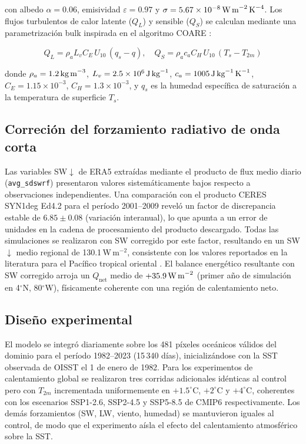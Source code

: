 \documentclass[12pt, a4paper]{article}
\begin{document}
\noindent con albedo $\alpha = 0.06$, emisividad $\varepsilon = 0.97$ y 
$\sigma = 5.67 \times 10^{-8}\,\text{W\,m}^{-2}\,\text{K}^{-4}$. Los flujos 
turbulentos de calor latente ($Q_L$) y sensible ($Q_S$) se calculan mediante una 
parametrizaci\'on bulk inspirada en el algoritmo COARE 
\cite{Fairall1996, Fairall2003}:

\begin{equation}
	Q_L = \rho_a L_v C_E\, U_{10}\,(q_s - q), \quad
	Q_S = \rho_a c_a C_H\, U_{10}\,(T_s - T_{2m})
	\label{eq:turb}
\end{equation}

\noindent donde $\rho_a = 1.2\,\text{kg\,m}^{-3}$, $L_v = 2.5 \times 10^6\,\text{J\,kg}^{-1}$, 
$c_a = 1005\,\text{J\,kg}^{-1}\,\text{K}^{-1}$, $C_E = 1.15 \times 10^{-3}$, 
$C_H = 1.3 \times 10^{-3}$, y $q_s$ es la humedad espec\'ifica de saturaci\'on a la 
temperatura de superficie $T_s$.

\subsection{Correci\'on del forzamiento radiativo de onda corta}

Las variables SW$\downarrow$ de ERA5 extra\'idas mediante el producto de flux medio diario 
(\texttt{avg\_sdswrf}) presentaron valores sistem\'aticamente bajos respecto a 
observaciones independientes. Una comparaci\'on con el producto CERES SYN1deg Ed4.2 para 
el per\'iodo 2001--2009 revel\'o un factor de discrepancia estable de $6.85 \pm 0.08$ 
(variaci\'on interanual), lo que apunta a un error de unidades en la cadena de 
procesamiento del producto descargado. Todas las simulaciones se realizaron con SW 
corregido por este factor, resultando en un SW$\downarrow$ medio regional de 130.1\,W\,m$^{-2}$, 
consistente con los valores reportados en la literatura para el Pac\'ifico tropical 
oriental \cite{SwensonHansen1999}. El balance energ\'etico resultante con SW corregido 
arroja un $Q_\text{net}$ medio de $+35.9\,\text{W\,m}^{-2}$ (primer a\~no de 
simulaci\'on en 4$^{\circ}$N, 80$^{\circ}$W), f\'isicamente coherente con una 
regi\'on de calentamiento neto.

\subsection{Dise\~no experimental}

El modelo se integr\'o diariamente sobre los 481 p\'ixeles oce\'anicos v\'alidos del 
dominio para el per\'iodo 1982--2023 (15\,340 d\'ias), inicializ\'andose con la SST 
observada de OISST el 1 de enero de 1982. Para los experimentos de calentamiento global 
se realizaron tres corridas adicionales id\'enticas al control pero con $T_{2m}$ 
incrementada uniformemente en $+1.5^{\circ}$C, $+2^{\circ}$C y $+4^{\circ}$C, 
coherentes con los escenarios SSP1-2.6, SSP2-4.5 y SSP5-8.5 de CMIP6 \cite{Eyring2016} 
respectivamente. Los dem\'as forzamientos (SW, LW, viento, humedad) se mantuvieron 
iguales al control, de modo que el experimento a\'isla el efecto del calentamiento 
atmosf\'erico sobre la SST.
\end{document}
